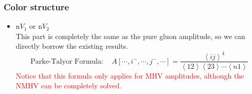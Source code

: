 \documentclass{beamer}
\newcommand{\avg}[1]{\left\langle #1 \right\rangle}
\begin{document}
\begin{frame}
    \frametitle{Color structure}
    \begin{itemize}
        \item n$ V_1$ or n$V_2$\\
        This part is completely the same as the pure gluon amplitude, so we can directly borrow the
        existing results.
        \begin{equation*}
            \boxed{\text{Parke-Talyor Formula}:\quad A[\cdots,i^-,\cdots,j^-,\cdots]=\frac{\avg{ij}^4}{\avg{12}\!\avg{23}\cdots\avg{n1}}}
        \end{equation*}
        \textcolor{red}{Notice that this formula only applies for MHV amplitudes, although the NMHV can be completely solved.}
    \end{itemize}
\end{frame}
\end{document}
